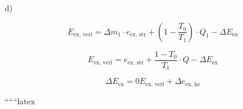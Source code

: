 d)

\[
E_{\text{ex, verl}} = \Delta m_1 \cdot e_{\text{ex, str}} + \left( 1 - \frac{T_0}{T_1} \right) \cdot Q_1 - \Delta E_{\text{ex}}
\]

\[
E_{\text{ex, verl}} = e_{\text{ex, str}} + \frac{1 - T_0}{T_1} \cdot Q - \Delta E_{\text{ex}}
\]

\[
\Delta E_{\text{ex}} = 0 E_{\text{ex, verl}} + \Delta e_{\text{ex, ke}}
\]

``````latex